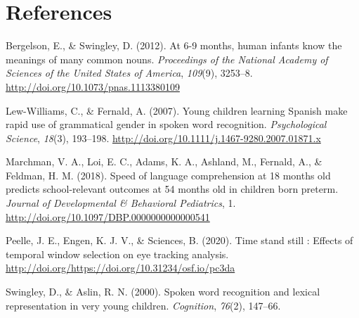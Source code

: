 \documentclass[10pt, letterpaper]{article}
\begin{document}
\hypertarget{references}{%
\section{References}\label{references}}

\setlength{\parindent}{-0.1in} 
\setlength{\leftskip}{0.125in}

\noindent

\hypertarget{refs}{}
\leavevmode\hypertarget{ref-Bergelson2012a}{}%
Bergelson, E., \& Swingley, D. (2012). At 6-9 months, human infants know
the meanings of many common nouns. \emph{Proceedings of the National
Academy of Sciences of the United States of America}, \emph{109}(9),
3253--8. \url{http://doi.org/10.1073/pnas.1113380109}

\leavevmode\hypertarget{ref-Lew-Williams2007}{}%
Lew-Williams, C., \& Fernald, A. (2007). Young children learning Spanish
make rapid use of grammatical gender in spoken word recognition.
\emph{Psychological Science}, \emph{18}(3), 193--198.
\url{http://doi.org/10.1111/j.1467-9280.2007.01871.x}

\leavevmode\hypertarget{ref-Marchman2018}{}%
Marchman, V. A., Loi, E. C., Adams, K. A., Ashland, M., Fernald, A., \&
Feldman, H. M. (2018). Speed of language comprehension at 18 months old
predicts school-relevant outcomes at 54 months old in children born
preterm. \emph{Journal of Developmental \& Behavioral Pediatrics}, 1.
\url{http://doi.org/10.1097/DBP.0000000000000541}

\leavevmode\hypertarget{ref-Peelle2020}{}%
Peelle, J. E., Engen, K. J. V., \& Sciences, B. (2020). Time stand still
: Effects of temporal window selection on eye tracking analysis.
\url{http://doi.org/https://doi.org/10.31234/osf.io/pc3da}

\leavevmode\hypertarget{ref-Swingley2000}{}%
Swingley, D., \& Aslin, R. N. (2000). Spoken word recognition and
lexical representation in very young children. \emph{Cognition},
\emph{76}(2), 147--66.


\end{document}
